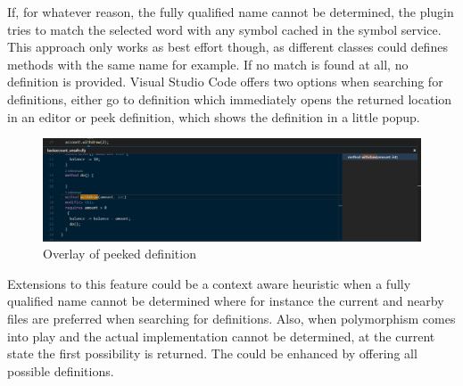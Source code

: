 If, for whatever reason, the fully qualified name cannot be determined, the plugin tries to match the selected word with any symbol cached in the symbol service. This approach only works as best effort though, as different classes could defines methods with the same name for example. If no match is found at all, no definition is provided. \newline
Visual Studio Code offers two options when searching for definitions, either go to definition which immediately opens the returned location in an editor or peek definition, which shows the definition in a little popup. \newline
 \begin{figure}[H]
	\centering
	\includegraphics[width=1\textwidth]{img/goToDefinitionPeek}
	\caption{Overlay of peeked definition}
	\label{fig:gotodefinitionpeek}
\end{figure}
Extensions to this feature could be a context aware heuristic when a fully qualified name cannot be determined where for instance the current and nearby files are preferred when searching for definitions. Also, when polymorphism comes into play and the actual implementation cannot be determined, at the current state the first possibility is returned. The could be enhanced by offering all possible definitions.


